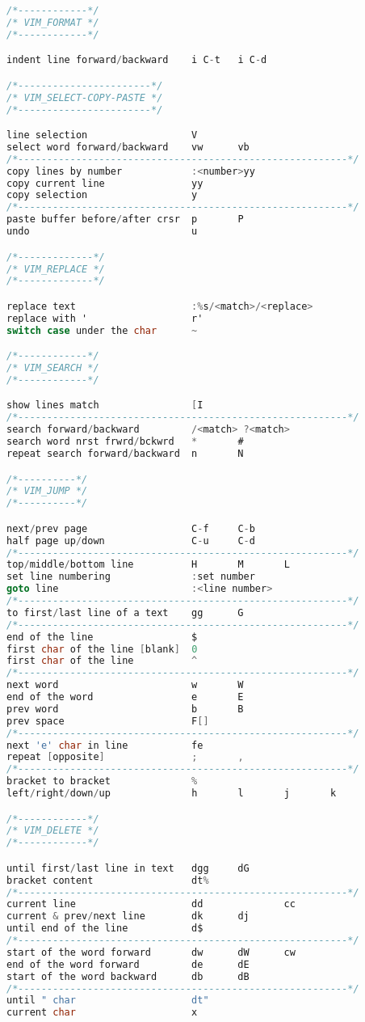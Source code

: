 \documentclass[8pt]{extarticle}
\begin{document}
\begin{small}
\begin{multicols}{2}
\begin{lstlisting}[language=C]
/*------------*/
/* VIM_FORMAT */
/*------------*/

indent line forward/backward 	i C-t	i C-d		

/*-----------------------*/
/* VIM_SELECT-COPY-PASTE */
/*-----------------------*/

line selection					V
select word forward/backward 	vw		vb
/*---------------------------------------------------------*/
copy lines by number			:<number>yy
copy current line				yy
copy selection					y
/*---------------------------------------------------------*/
paste buffer before/after crsr	p		P
undo							u

/*-------------*/
/* VIM_REPLACE */
/*-------------*/

replace text					:%s/<match>/<replace>
replace with '					r'
switch case under the char		~

/*------------*/
/* VIM_SEARCH */
/*------------*/

show lines match				[I
/*---------------------------------------------------------*/
search forward/backward			/<match> ?<match>
search word nrst frwrd/bckwrd	*		#
repeat search forward/backward	n		N

/*----------*/
/* VIM_JUMP */
/*----------*/

next/prev page					C-f		C-b
half page up/down				C-u		C-d
/*---------------------------------------------------------*/
top/middle/bottom line			H		M		L
set line numbering				:set number
goto line						:<line number>
/*---------------------------------------------------------*/
to first/last line of a text 	gg		G
/*---------------------------------------------------------*/
end of the line					$	
first char of the line [blank]	0
first char of the line			^
/*---------------------------------------------------------*/
next word						w		W
end of the word 				e		E
prev word						b		B
prev space						F[]
/*---------------------------------------------------------*/
next 'e' char in line			fe
repeat [opposite]				;		,
/*---------------------------------------------------------*/
bracket to bracket				%
left/right/down/up				h		l		j		k

/*------------*/
/* VIM_DELETE */
/*------------*/

until first/last line in text	dgg		dG
bracket content					dt%
/*---------------------------------------------------------*/
current line					dd				cc
current & prev/next line 		dk		dj
until end of the line			d$
/*---------------------------------------------------------*/
start of the word forward		dw		dW		cw
end of the word forward	 		de		dE
start of the word backward		db		dB
/*---------------------------------------------------------*/
until " char					dt"
current	char					x


\end{lstlisting}
\end{multicols}
\end{small}
\end{document}
